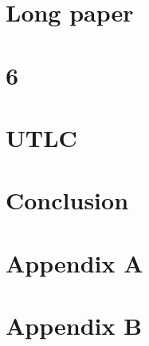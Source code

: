 \documentclass[a4paper, 12pt, twoside,openright]{report}
\begin{document}
\chapter{Long paper}
	
	
	
	
	
	
	
	

\chapter{6}
	
	
	
	
	
	
	

\chapter{UTLC}
	
	
	
	
	
	
	
	

\chapter
	[''Everything that has a beginning has an ending. Make your peace with that and all will be well'' - Jack Kornfield]
	{Conclusion}
	

\Appendix

\chapter{Appendix A}
	
	
	
	
	
	
	
	

\chapter{Appendix B}
	
	
	

\printbibheading
{}

	\printbibliography[heading=subbibliography,notkeyword={Behavioral}, title=Others]
\end{document}
